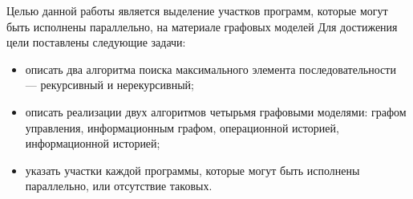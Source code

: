 
Целью данной работы является выделение участков программ, которые могут быть исполнены параллельно, на материале графовых моделей
Для достижения цели поставлены следующие задачи:
\begin{itemize}
	\item описать два алгоритма поиска максимального элемента последовательности --- рекурсивный и нерекурсивный;
	\item описать реализации двух алгоритмов четырьмя графовыми моделями: графом управления, информационным графом, операционной историей, информационной историей;
	\item указать участки каждой программы, которые могут быть исполнены параллельно, или отсутствие таковых.
\end{itemize}
\clearpage
